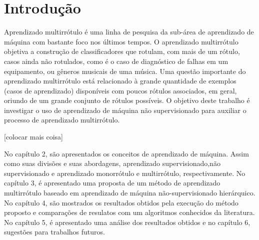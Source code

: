 

\chapter{Introdução}
\thispagestyle{empty} %
\label{chapter:intro}

Aprendizado multirrótulo é uma linha de pesquisa da sub-área de aprendizado de máquina com bastante foco nos últimos tempos. O aprendizado multirrótulo objetiva a construção de classificadores que rotulam, com mais de um rótulo, casos ainda não rotulados, como é o caso de diagnóstico de falhas em um equipamento, ou gêneros musicais de uma música. Uma questão importante do aprendizado multirrótulo está relacionado à grande quantidade de exemplos (casos de aprendizado) disponíveis com poucos rótulos associados, em geral, oriundo de um grande conjunto de rótulos
possíveis. O objetivo deste trabalho é investigar o uso de aprendizado de máquina não supervisionado para auxiliar o processo de aprendizado multirrótulo.

[colocar mais coisa]

No capítulo 2, são apresentados os conceitos de aprendizado de máquina. Assim como suas divisões e suas abordagens, aprendizado supervisionado,não supervisionado e aprendizado monorrótulo e multirrótulo, respectivamente. No capítulo 3, é apresentado uma proposta de um método de aprendizado multirrótulo baseado em aprendizado de máquina não-supervisionado hierárquico. No capítulo 4, são mostrados os resultados obtidos pela execução do método proposto e comparações de resulatos com um algoritmos conhecidos da literatura. No capítulo 5, é apresentado uma análise dos resultados obtidos e no capítulo 6, sugestões para trabalhos futuros.


